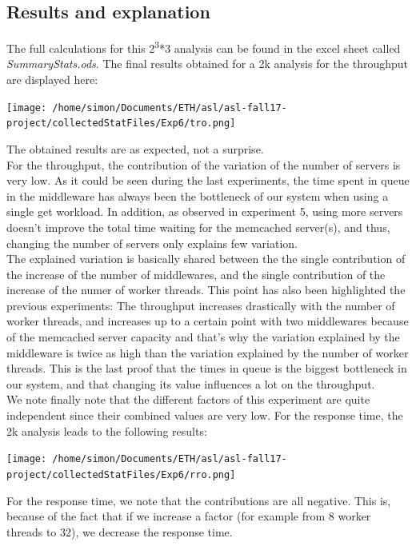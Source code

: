 \documentclass[11pt,a4paper]{article}
\begin{document}
\subsection{Results and explanation}
The full calculations for this 2\textsuperscript{3}*3 analysis can be found in the excel sheet called \textit{SummaryStats.ods}. The final results obtained for a 2k analysis for the throughput are displayed here:
\begin{center} 
\texttt{[image: /home/simon/Documents/ETH/asl/asl-fall17-project/collectedStatFiles/Exp6/tro.png]}
\end{center}
The obtained results are as expected, not a surprise. 
\\
For the throughput, the contribution of the variation of the number of servers is very low. As it could be seen during the last experiments, the time spent in queue in the middleware has always been the bottleneck of our system when using a single get workload. In addition, as observed in experiment 5, using more servers doesn't improve the total time waiting for the memcached server(s), and thus, changing the number of servers only explains few variation. 
\\
The explained variation is basically shared between the the single contribution of the increase of the number of middlewares, and the single contribution of the increase of the numer of worker threads. This point has also been highlighted the previous experiments: The throughput increases drastically with the number of worker threads, and increases up to a certain point with two middlewares because of the memcached server capacity and that's why the variation explained by the middleware is twice as high than the variation explained by the number of worker threads. This is the last proof that the times in queue is the biggest bottleneck in our system, and that changing its value influences a lot on the throughput. 
\\We note finally note that the different factors of this experiment are quite independent since their combined values are very low. 
\newpage
For the response time, the 2k analysis leads to the following results:
\\
\begin{center} 
\texttt{[image: /home/simon/Documents/ETH/asl/asl-fall17-project/collectedStatFiles/Exp6/rro.png]}
\end{center} 
For the response time, we note that the contributions are all negative. This is, because of the fact that if we increase a factor (for example from 8 worker threads to 32), we decrease the response time. 
\end{document}
